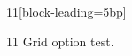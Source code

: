 \documentclass[paper=A4]{ropas-poster}
\begin{document}
\begin{postergrid}{1}{1}[block-leading=5bp]
\begin{posterblock}{1}{1}
Grid option test.
\end{posterblock}
\end{postergrid}
\end{document}
